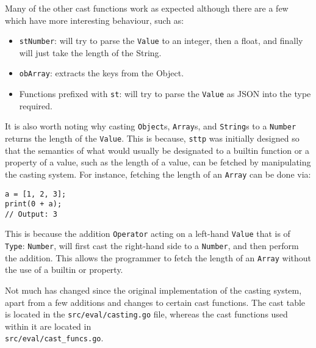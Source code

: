 Many of the other cast functions work as expected although there are a few which have more interesting behaviour, such as:

\begin{itemize}
    \item \verb|stNumber|: will try to parse the \verb|Value| to an integer, then a float, and finally will just take the length of the String.
    \item \verb|obArray|: extracts the keys from the Object.
    \item Functions prefixed with \verb|st|: will try to parse the \verb|Value| as JSON into the type required.
\end{itemize}

It is also worth noting why casting \verb|Object|s, \verb|Array|s, and \verb|String|s to a \verb|Number| returns the length of the \verb|Value|. This is because, \verb|sttp| was initially designed so that the semantics of what would usually be designated to a builtin function or a property of a value, such as the length of a value, can be fetched by manipulating the casting system. For instance, fetching the length of an \verb|Array| can be done via:

\begin{verbatim}
a = [1, 2, 3];
print(0 + a);
// Output: 3
\end{verbatim}

This is because the addition \verb|Operator| acting on a left-hand \verb|Value| that is of \verb|Type|: \verb|Number|, will first cast the right-hand side to a \verb|Number|, and then perform the addition. This allows the programmer to fetch the length of an \verb|Array| without the use of a builtin or property.

Not much has changed since the original implementation of the casting system, apart from a few additions and changes to certain cast functions. The cast table is located in the \verb|src/eval/casting.go| file, whereas the cast functions used within it are located in \\\verb|src/eval/cast_funcs.go|.
